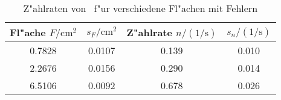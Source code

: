 \begin{table}[H]
\caption{Z"ahlraten von \samarium~f"ur verschiedene Fl"achen mit Fehlern}
\begin{center}
\begin{tabular}{|c|c|c|c|}
  \hline
  Fl"ache $F / \text{cm}^2$ & $s_F / \text{cm}^2$ & Z"ahlrate $n / (1/\text{s})$ & $s_n / (1/\text{s})$ \\ \hline 
  0.7828 & 0.0107 & 0.139 & 0.010 \\ \hline
  2.2676 & 0.0156 & 0.290 & 0.014 \\ \hline
  6.5106 & 0.0092 & 0.678 & 0.026 \\ \hline
\end{tabular}
\end{center}
\label{tab:data:samarium}
\end{table}
